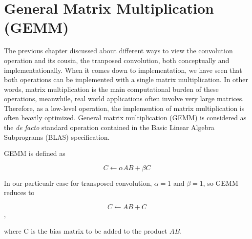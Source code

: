 
\chapter{General Matrix Multiplication (GEMM)}

The previous chapter discussed about different ways to view the convolution operation and its cousin,
the tranposed convolution, both conceptually and implementationally. When it comes down to implementation,
we have seen that both operations can be implemented with a single matrix multiplication. In other words,
matrix multiplication is the main computational burden of these operations, meanwhile, real world applications
often involve very large matrices. Therefore, as a low-level operation, the implemention of matrix
multiplication is often heavily optimized. General matrix multiplication (GEMM) is considered as the
\textit{de facto} standard operation contained in the Basic Linear Algebra Subprograms (BLAS)
specification.

GEMM is defined as

$$C \leftarrow \alpha A B + \beta C$$

In our particualr case for transposed convolution, $\alpha = 1$ and $\beta = 1$, so GEMM reduces to

$$C \leftarrow A B + C$$,

where C is the bias matrix to be added to the product $A B$.


\clearpage %
